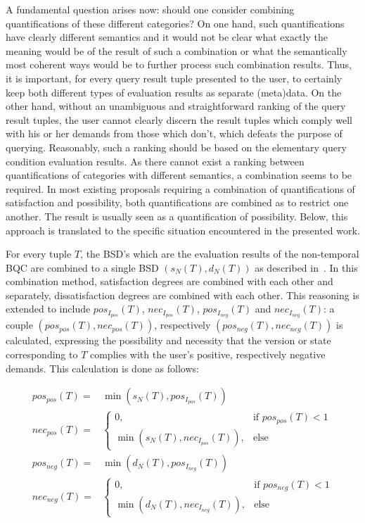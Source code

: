 \documentclass[runningheads,a4paper]{llncs}
\begin{document}
A fundamental question arises now: should one consider combining quantifications of these different categories? On one hand, such quantifications have clearly different semantics and it would not be clear what exactly the meaning would be of the result of such a combination or what the semantically most coherent ways would be to further process such combination results. Thus, it is important, for every query result tuple presented to the user, to certainly keep both different types of evaluation results as separate (meta)data. On the other hand, without an unambiguous and straightforward ranking of the query result tuples, the user cannot clearly discern the result tuples which comply well with his or her demands from those which don't, which defeats the purpose of querying. Reasonably, such a ranking should be based on the elementary query condition evaluation results. As there cannot exist a ranking between quantifications of categories with different semantics, a combination seems to be required. In most existing proposals requiring a combination of quantifications of satisfaction and possibility, both quantifications are combined as to restrict one another. The result is usually seen as a quantification of possibility. Below, this approach is translated to the specific situation encountered in the presented work.

For every tuple $T$, the BSD's which are the evaluation results of the non-temporal BQC are combined to a single BSD $(s_N(T), d_N(T))$ as described in~\cite{Matthe2011ijis}. In this combination method, satisfaction degrees are combined with each other and separately, dissatisfaction degrees are combined with each other. This reasoning is extended to include $pos_{I_{pos}}(T)$, $nec_{I_{pos}}(T)$, $pos_{I_{neg}}(T)$ and $nec_{I_{neg}}(T)$: a couple $(pos_{pos}(T), nec_{pos}(T))$, respectively $(pos_{neg}(T), nec_{neg}(T))$ is calculated, expressing the possibility and necessity that the version or state corresponding to $T$ complies with the user's positive, respectively negative demands. This calculation is done as follows:

\vspace{-10pt}
\begin{align}
pos_{pos}(T) = & \min(s_N(T), pos_{I_{pos}}(T)) \nonumber \\
nec_{pos}(T) = &
	\begin{cases}
	0, & \text{if } pos_{pos}(T) < 1 \\
	\min(s_N(T), nec_{I_{pos}}(T)), & \text{else}
	\end{cases}
	\nonumber \\
pos_{neg}(T) = & \min(d_N(T), pos_{I_{neg}}(T)) \nonumber \\
nec_{neg}(T) = &
	\begin{cases}
	0, & \text{if } pos_{neg}(T) < 1 \\
	\min(d_N(T), nec_{I_{neg}}(T)), & \text{else}
	\end{cases}
	\nonumber
\end{align}
\end{document}

